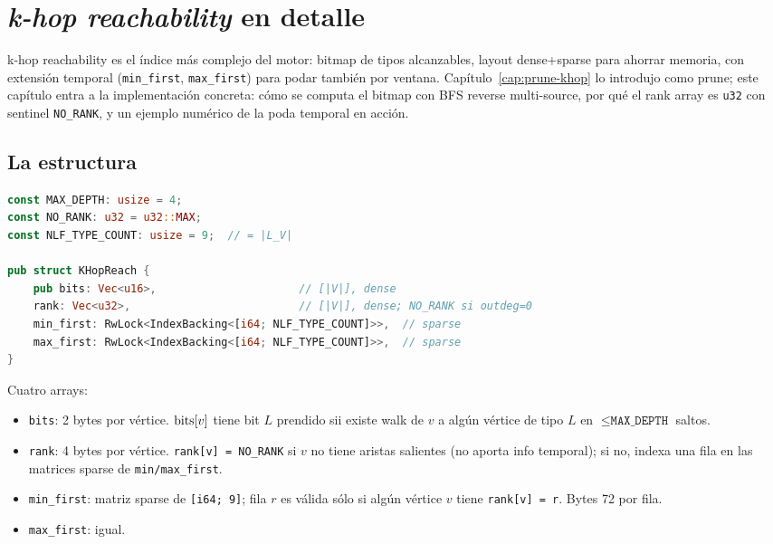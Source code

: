 \chapter{\emph{k-hop reachability} en detalle}
\label{cap:khop-detalle}

\begin{intuicion}
k-hop reachability es el índice más complejo del motor: bitmap
de tipos alcanzables, layout dense+sparse para ahorrar memoria,
con extensión temporal (\texttt{min\_first}, \texttt{max\_first})
para podar también por ventana. Capítulo~\ref{cap:prune-khop} lo
introdujo como prune; este capítulo entra a la implementación
concreta: cómo se computa el bitmap con BFS reverse multi-source,
por qué el rank array es \texttt{u32} con sentinel
\texttt{NO\_RANK}, y un ejemplo numérico de la poda temporal en
acción.
\end{intuicion}

\section{La estructura}

\begin{lstlisting}[language=Rust]
const MAX_DEPTH: usize = 4;
const NO_RANK: u32 = u32::MAX;
const NLF_TYPE_COUNT: usize = 9;  // = |L_V|

pub struct KHopReach {
    pub bits: Vec<u16>,                      // [|V|], dense
    rank: Vec<u32>,                          // [|V|], dense; NO_RANK si outdeg=0
    min_first: RwLock<IndexBacking<[i64; NLF_TYPE_COUNT]>>,  // sparse
    max_first: RwLock<IndexBacking<[i64; NLF_TYPE_COUNT]>>,  // sparse
}
\end{lstlisting}

\noindent
Cuatro arrays:

\begin{itemize}
    \item \texttt{bits}: 2 bytes por vértice. \(\mathrm{bits}[v]\) tiene
    bit \(L\) prendido sii existe walk de \(v\) a algún vértice
    de tipo \(L\) en \(\leq \texttt{MAX\_DEPTH}\) saltos.
    \item \texttt{rank}: 4 bytes por vértice.
    \texttt{rank[v] = NO\_RANK} si \(v\) no tiene aristas salientes
    (no aporta info temporal); si no, indexa una fila en las
    matrices sparse de \texttt{min/max\_first}.
    \item \texttt{min\_first}: matriz sparse de \texttt{[i64; 9]};
    fila \(r\) es válida sólo si algún vértice \(v\) tiene
    \texttt{rank[v] = r}. Bytes 72 por fila.
    \item \texttt{max\_first}: igual.
\end{itemize}

